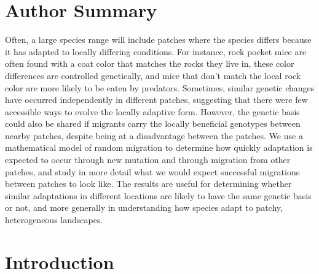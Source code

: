 \documentclass[10pt,letterpaper]{article}
\newcommand{\citep}[1]{\cite{#1}}
\begin{document}
\section*{Author Summary}
Often, a large species range will include patches where the species differs because it has adapted to locally differing conditions.
For instance, rock pocket mice are often found with a coat color that matches the rocks they live in,
these color differences are controlled genetically,
and mice that don't match the local rock color are more likely to be eaten by predators.
Sometimes, similar genetic changes have occurred independently in different patches,
suggesting that there were few accessible ways to evolve the locally adaptive form.
However, the genetic basis could also be shared if
migrants carry the locally beneficial genotypes between nearby patches,
despite being at a disadvantage between the patches.
We use a mathematical model of random migration to determine how quickly adaptation is expected to occur 
through new mutation and through migration from other patches,
and study in more detail what we would expect successful migrations between patches to look like.
The results are useful for determining whether similar adaptations in different locations are likely to have the same genetic basis or not,
and more generally in understanding how species adapt to patchy, heterogeneous landscapes.


\linenumbers


\section*{Introduction}

\end{document}
